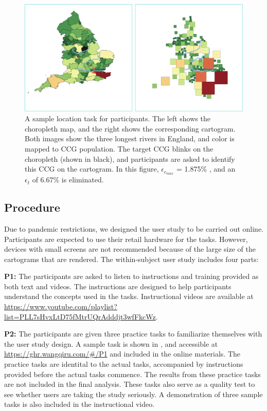 \documentclass[Afour,sagev,times]{sagej}
\newcommand{\nodeError}{\epsilon}
\newcommand{\nodeCartographicErrorMax}{\nodeError_{c_{max}}}
\newcommand{\nodeTopologicalError}{\nodeError_{t}}
\begin{document}
    {
        \begin{figure}[tb!]
            \centering
            \includegraphics[width=\columnwidth,keepaspectratio]{task.png}
            \caption{A sample location task for participants.
                The left shows the choropleth map, and the right shows the corresponding cartogram.
                Both images show the three longest rivers in England, and color is mapped to CCG population.
                The target CCG blinks on the choropleth (shown in black), and participants are asked to identify this CCG on the cartogram.
                In this figure, $ \nodeCartographicErrorMax $ = 1.875\% , and an $ \nodeTopologicalError $ of 6.67\% is eliminated.
            }
            \label{fig:task}
        \end{figure}
    }

\subsection{Procedure}\label{subsec:{Procedure}}

Due to pandemic restrictions, we designed the user study to be carried out online.
Participants are expected to use their retail hardware for the tasks.
However, devices with small screens are not recommended because of the large size of the cartograms that are rendered.
The within-subject user study includes four parts:

\textbf{P1:} The participants are asked to listen to instructions and training provided as both text and videos.
The instructions are designed to help participants understand the concepts used in the tasks.
Instructional videos are available at \url{https://www.youtube.com/playlist?list=PLL7sHvxLtD75fMtrUQrAdddjt3wfFkcWz}.

\textbf{P2:} The participants are given three practice tasks to familiarize themselves with the user study design.
A sample task is shown in , and accessible at \url{https://ghr.wangqiru.com/#/P1} and included in the online materials\footnotemark{}.
The practice tasks are identital to the actual tasks, accompanied by instructions provided before the actual tasks commence.
The results from these practice tasks are not included in the final analysis.
These tasks also serve as a quality test to see whether users are taking the study seriously.
A demonstration of three sample tasks is also included in the instructional video.
\end{document}
